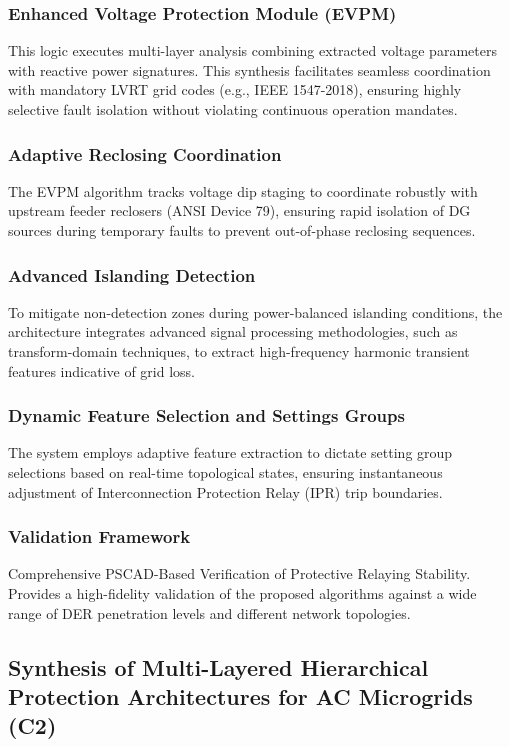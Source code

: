 \subsubsection{Enhanced Voltage Protection Module (EVPM)}
This logic executes multi-layer analysis combining extracted voltage parameters with reactive power signatures. This synthesis facilitates seamless coordination with mandatory LVRT grid codes (e.g., IEEE 1547-2018), ensuring highly selective fault isolation without violating continuous operation mandates.
\subsubsection{Adaptive Reclosing Coordination}
The EVPM algorithm tracks voltage dip staging to coordinate robustly with upstream feeder reclosers (ANSI Device 79), ensuring rapid isolation of DG sources during temporary faults to prevent out-of-phase reclosing sequences.
\subsubsection{Advanced Islanding Detection}
To mitigate non-detection zones during power-balanced islanding conditions, the architecture integrates advanced signal processing methodologies, such as transform-domain techniques, to extract high-frequency harmonic transient features indicative of grid loss.
\subsubsection{Dynamic Feature Selection and Settings Groups}
The system employs adaptive feature extraction to dictate setting group selections based on real-time topological states, ensuring instantaneous adjustment of Interconnection Protection Relay (IPR) trip boundaries.

\subsubsection{Validation Framework}
Comprehensive PSCAD-Based Verification of Protective Relaying Stability. Provides a high-fidelity validation of the proposed algorithms against a wide range of DER penetration levels and different network topologies.

    
\subsection{Synthesis of Multi-Layered Hierarchical Protection Architectures for AC Microgrids (C2)}

